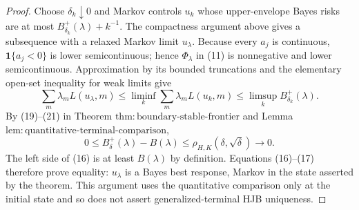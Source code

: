 \documentclass{article}
\begin{document}
\begin{proof}
Choose \(\delta_k\downarrow0\) and Markov controls \(u_k\) whose upper-envelope Bayes risks are at most \(B_{\delta_k}^+(\lambda)+k^{-1}\).  The compactness argument above gives a subsequence with a relaxed Markov limit \(u_\lambda\).  Because every \(a_j\) is continuous, \(\mathbf1\{a_j<0\}\) is lower semicontinuous; hence \(\Phi_\lambda\) in (11) is nonnegative and lower semicontinuous.  Approximation by its bounded truncations and the elementary open-set inequality for weak limits give
\[
 \sum_m\lambda_mL(u_\lambda,m)
 \leq\liminf_k\sum_m\lambda_mL(u_k,m)
 \leq\limsup_k B_{\delta_k}^+(\lambda).                          \tag{16}
\]
By (19)--(21) in Theorem \(\mathrm{thm{:}boundary\text{-}stable\text{-}frontier}\) and Lemma \(\mathrm{lem{:}quantitative\text{-}terminal\text{-}comparison}\),
\[
 0\leq B_{\delta}^+(\lambda)-B(\lambda)
 \leq\rho_{H,K}(\delta,\sqrt\delta)\longrightarrow0.           \tag{17}
\]
The left side of (16) is at least \(B(\lambda)\) by definition.  Equations (16)--(17) therefore prove equality: \(u_\lambda\) is a Bayes best response, Markov in the state asserted by the theorem.  This argument uses the quantitative comparison only at the initial state and so does not assert generalized-terminal HJB uniqueness.


\end{proof}
\end{document}
